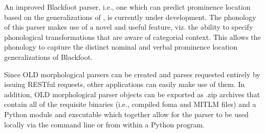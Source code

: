 \documentclass[11pt]{article}
\begin{document}
An improved Blackfoot parser, i.e., one which can predict prominence location
based on the generalizations of \cite{weber2013}, is currently under
development. The phonology of this parser makes use of a novel and useful
feature, viz. the ability to specify phonological transformations that are
aware of categorial context. This allows the phonology to capture the distinct
nominal and verbal prominence location generalizations of Blackfoot.

Since OLD morphological parsers can be created and parses requested entirely by
issuing RESTful requests, other applications can easily make use of them. In
addition, OLD morphological parser objects can be exported as .zip archives
that contain all of the requisite binaries (i.e., compiled foma and MITLM
files) and a Python module and executable which together allow for the parser
to be used locally via the command line or from within a Python program.
\end{document}
